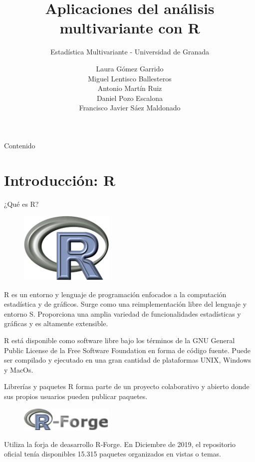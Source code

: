 \documentclass[xcolor=table]{beamer}
\title{Aplicaciones del análisis multivariante con R}
\subtitle{Estadística Multivariante - Universidad de Granada}
\author{Laura Gómez Garrido\\ Miguel Lentisco Ballesteros \\ Antonio Martín Ruiz \\ Daniel Pozo Escalona \\Francisco Javier Sáez Maldonado}
\begin{document}
\begin{frame}
\titlepage
\end{frame}
\begin{frame}{Contenido}
  \tableofcontents
\end{frame}
\section{Introducción: R}

\begin{frame}{¿Qué es R?}
\begin{figure}
\centering
\includegraphics[width=0.4\textwidth]{r.png}
\end{figure}{
R es un entorno y lenguaje de programación enfocados a la computación
estadística y de gráficos. Surge como una reimplementación libre del lenguaje y
entorno S. Proporciona una amplia variedad de funcionalidades estadísticas y
gráficas y es altamente extensible.}

\end{frame}

\begin{frame}
  
R está disponible como software libre bajo los términos de la GNU General Public
License de la Free Software Foundation en forma de código fuente. Puede ser
compilado y ejecutado en una gran cantidad de plataformas UNIX, Windows y MacOs.

\end{frame}

\begin{frame}{Librerías y paquetes}
R forma parte de un proyecto colaborativo y abierto donde sus propios usuarios pueden publicar paquetes.
\newline
\newline
\begin{figure}
\centering
\includegraphics[width=0.4\textwidth]{r-forge.png}
\end{figure}
{Utiliza la forja de deasarrollo R-Forge.}
\newline
\newline
{En Diciembre de 2019, el repositorio oficial tenía disponibles 15.315 paquetes organizados en vistas o temas. }
\end{frame}
\end{document}
